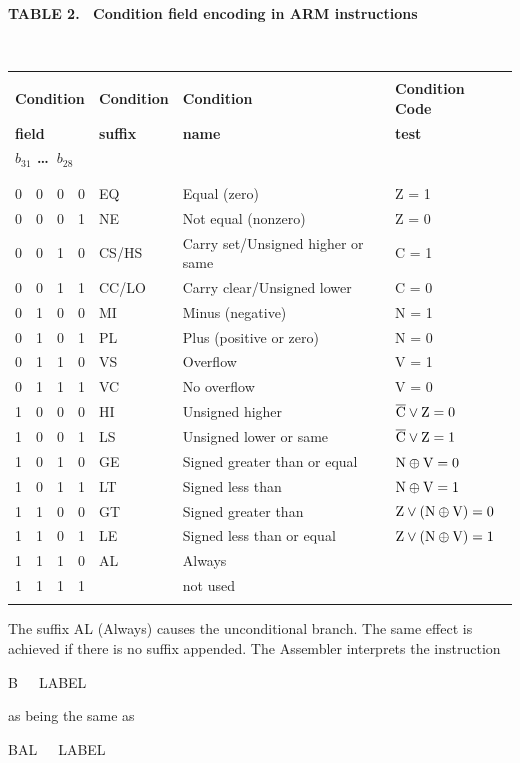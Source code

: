 \documentclass[11pt, twoside, pdftex]{article}
\begin{document}
\newcommand{\vs}{\rule{0pt}{1ex}\\}

\begin{center}
{\bf TABLE 2. ~Condition field encoding in ARM instructions}
\vs
\begin{tabular}{llll}
\hline
\vs
{\bf Condition} & {\bf Condition} &  {\bf Condition} & {\bf Condition Code}\\
{\bf field} & {\bf suffix} & {\bf name} & {\bf test}\\
{\bf $b_{31}$ \ldots~$b_{28}$} & & &\\
\vs
\hline
\vs
0~~0~~0~~0 & EQ & Equal (zero) & Z = 1\\
0~~0~~0~~1 & NE & Not equal (nonzero) & Z = 0\\
0~~0~~1~~0 & CS/HS & Carry set/Unsigned higher or same & C = 1\\
0~~0~~1~~1 & CC/LO & Carry clear/Unsigned lower & C = 0\\
0~~1~~0~~0 & MI & Minus (negative) & N = 1\\
0~~1~~0~~1 & PL & Plus (positive or zero) & N = 0\\
0~~1~~1~~0 & VS & Overflow & V = 1\\
0~~1~~1~~1 & VC & No overflow & V = 0\\
1~~0~~0~~0 & HI & Unsigned higher & $\overline{\rm C} \vee {\rm Z} = 0$\\
1~~0~~0~~1 & LS & Unsigned lower or same & $\overline{\rm C} \vee {\rm Z} = 1$\\
1~~0~~1~~0 & GE & Signed greater than or equal  & 
${\rm N} \oplus {\rm V} = 0$\\
1~~0~~1~~1 & LT & Signed less than & ${\rm N} \oplus {\rm V} = 1$\\
1~~1~~0~~0 & GT & Signed greater than &
${\rm Z} \vee ({\rm N} \oplus {\rm V}) = 0$\\
1~~1~~0~~1 & LE & Signed less than or equal &
${\rm Z} \vee ({\rm N} \oplus {\rm V}) = 1$\\
1~~1~~1~~0 & AL & Always & \\
1~~1~~1~~1 & & not used &\\
\vs
\hline
\end{tabular}
\end{center}

The suffix AL (Always) causes the unconditional branch. The same 
effect is achieved if there is no suffix appended. The Assembler 
interprets the instruction
\begin{center}
B~~~LABEL
\end{center}
\noindent
as being the same as
\begin{center}
BAL~~~LABEL
\end{center}
\noindent
\end{document}
